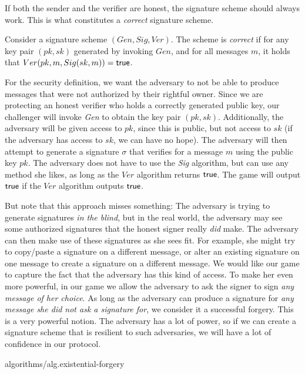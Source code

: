 If both the sender and the verifier are honest, the signature scheme should always
work. This is what constitutes a \emph{correct} signature scheme.

\begin{definition}
  Consider a signature scheme $(Gen, Sig, Ver)$. The scheme is \emph{correct} if
  for any key pair $(pk, sk)$ generated by invoking $Gen$, and
  for all messages $m$, it holds that $Ver(pk, m, Sig(sk, m)) = \textsf{true}$.
\end{definition}

For the security definition, we want the adversary to not be able to produce
messages that were not authorized by their rightful owner. Since we are protecting
an honest verifier who holds a correctly generated public key, our challenger will
invoke \emph{Gen} to obtain the key pair $(pk, sk)$. Additionally, the adversary will
be given access to $pk$, since this is public, but not access to $sk$ (if the adversary
has access to $sk$, we can have no hope). The adversary will then attempt to generate
a signature $\sigma$ that verifies for a message $m$ using the public key $pk$.
The adversary does not have to use the \emph{Sig} algorithm, but can use any method
she likes, as long as the $Ver$ algorithm returns $\textsf{true}$. The game will output
$\textsf{true}$ if the $Ver$ algorithm outputs $\textsf{true}$.

But note that this approach misses something: The adversary is trying to generate
signatures \emph{in the blind}, but in the real world, the adversary may see some
authorized signatures that the honest signer really \emph{did} make. The adversary
can then make use of these signatures as she sees fit. For example, she might try
to copy/paste a signature on a different message, or alter an existing signature
on one message to create a signature on a different message. We would like our
game to capture the fact that the adversary has this kind of access. To make her
even more powerful, in our game we allow the adversary to ask the signer to sign
\emph{any message of her choice}. As long as the adversary can produce a signature
for \emph{any message she did not ask a signature for}, we consider it a successful
forgery. This is a very powerful notion. The adversary has a lot of power, so if
we can create a signature scheme that is resilient to such adversaries, we will have
a lot of confidence in our protocol.

{algorithms/alg.existential-forgery}

